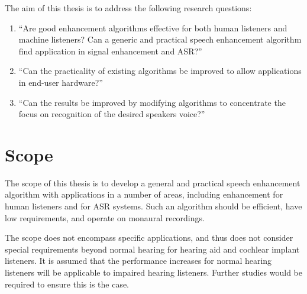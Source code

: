 \newcommand{\RQone}{``Are good enhancement algorithms effective for both human listeners and machine listeners? Can a generic and practical speech enhancement algorithm find application in signal enhancement and \ac{ASR}?''}
\newcommand{\RQthree}{``Can the results be improved by modifying algorithms to concentrate the focus on recognition of the desired speakers voice?''}
\newcommand{\RQtwo}{``Can the practicality of existing algorithms be improved to allow applications in end-user hardware?''}

The aim of this thesis is to address the following research questions:
\begin{enumerate}
\item \label{enu:ResQ1} \RQone{}
\item \label{enu:ResQ2}\RQtwo{}
\item \label{enu:ResQ3}\RQthree{}
\end{enumerate}

\section{Scope}

The scope of this thesis is to develop a general and practical speech
enhancement algorithm with applications in a number of areas, including
enhancement for human listeners and for \ac{ASR} systems. Such an
algorithm should be efficient, have low requirements, and operate
on monaural recordings.

The scope does not encompass specific applications, and thus does
not consider special requirements beyond normal hearing for hearing
aid and cochlear implant listeners. It is assumed that the performance
increases for normal hearing listeners will be applicable to impaired
hearing listeners. Further studies would be required to ensure this
is the case.%

